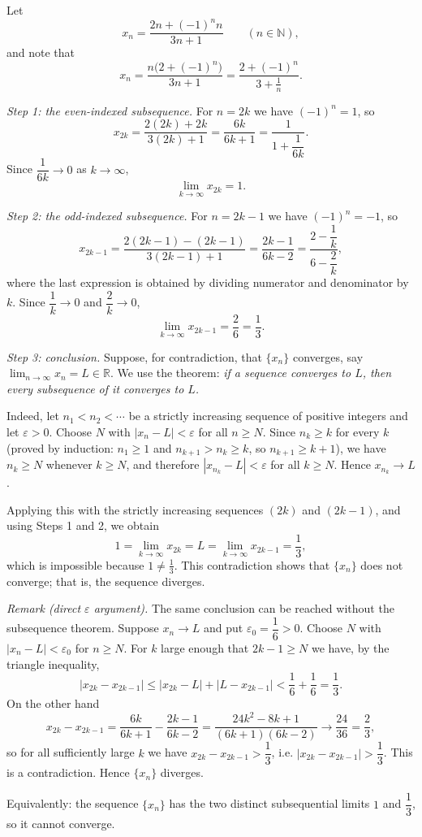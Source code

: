 \documentclass[11pt,a4paper]{article}
\newenvironment{solution}[1]{%
  \par\addvspace{1.7ex}%
  \noindent{\color{solutioncolor}\textbf{#1}}\hspace{0.55em}\ignorespaces}%
  {\par\addvspace{0.9ex}}
\begin{document}
\begin{solution}{Solution 2.1.5}\label{xs:2.1.5}
Let
\[
  x_n=\frac{2n+(-1)^{n}n}{3n+1}\qquad(n\in\mathbb{N}),
\]
and note that
\[
  x_n=\frac{n\bigl(2+(-1)^{n}\bigr)}{3n+1}
  =\frac{2+(-1)^{n}}{3+\tfrac1n} .
\]

\medskip
\noindent\emph{Step 1: the even-indexed subsequence.}
For $n=2k$ we have $(-1)^{n}=1$, so
\[
  x_{2k}=\frac{2(2k)+2k}{3(2k)+1}=\frac{6k}{6k+1}
  =\frac{1}{1+\dfrac{1}{6k}} .
\]
Since $\dfrac{1}{6k}\to0$ as $k\to\infty$,
\[
  \lim_{k\to\infty}x_{2k}=1 .
\]

\medskip
\noindent\emph{Step 2: the odd-indexed subsequence.}
For $n=2k-1$ we have $(-1)^{n}=-1$, so
\[
  x_{2k-1}=\frac{2(2k-1)-(2k-1)}{3(2k-1)+1}
  =\frac{2k-1}{6k-2}
  =\frac{2-\dfrac1k}{6-\dfrac2k},
\]
where the last expression is obtained by dividing numerator and denominator by
$k$. Since $\dfrac1k\to0$ and $\dfrac2k\to0$,
\[
  \lim_{k\to\infty}x_{2k-1}=\frac{2}{6}=\frac13 .
\]

\medskip
\noindent\emph{Step 3: conclusion.}
Suppose, for contradiction, that $\{x_n\}$ converges, say
$\displaystyle\lim_{n\to\infty}x_n=L\in\mathbb{R}$. We use the theorem: \emph{if a
sequence converges to $L$, then every subsequence of it converges to $L$.}

Indeed, let $n_1<n_2<\cdots$ be a strictly increasing sequence of positive
integers and let $\varepsilon>0$. Choose $N$ with $|x_n-L|<\varepsilon$ for all
$n\ge N$. Since $n_k\ge k$ for every $k$ (proved by induction: $n_1\ge1$ and
$n_{k+1}>n_k\ge k$, so $n_{k+1}\ge k+1$), we have $n_k\ge N$ whenever $k\ge N$,
and therefore $|x_{n_k}-L|<\varepsilon$ for all $k\ge N$. Hence $x_{n_k}\to L$.

Applying this with the strictly increasing sequences $(2k)$ and $(2k-1)$, and
using Steps 1 and 2, we obtain
\[
  1=\lim_{k\to\infty}x_{2k}=L=\lim_{k\to\infty}x_{2k-1}=\frac13 ,
\]
which is impossible because $1\ne\tfrac13$. This contradiction shows that
$\{x_n\}$ does not converge; that is, the sequence diverges.

\medskip
\noindent\emph{Remark (direct $\varepsilon$ argument).} The same conclusion can
be reached without the subsequence theorem. Suppose $x_n\to L$ and put
$\varepsilon_0=\dfrac16>0$. Choose $N$ with $|x_n-L|<\varepsilon_0$ for $n\ge N$.
For $k$ large enough that $2k-1\ge N$ we have, by the triangle inequality,
\[
  \bigl|x_{2k}-x_{2k-1}\bigr|
  \le|x_{2k}-L|+|L-x_{2k-1}|<\frac16+\frac16=\frac13 .
\]
On the other hand
\[
  x_{2k}-x_{2k-1}=\frac{6k}{6k+1}-\frac{2k-1}{6k-2}
  =\frac{24k^{2}-8k+1}{(6k+1)(6k-2)}\longrightarrow\frac{24}{36}=\frac23 ,
\]
so for all sufficiently large $k$ we have $x_{2k}-x_{2k-1}>\dfrac13$, i.e.
$|x_{2k}-x_{2k-1}|>\dfrac13$. This is a contradiction. Hence $\{x_n\}$ diverges.

\medskip
\noindent Equivalently: the sequence $\{x_n\}$ has the two distinct
subsequential limits $1$ and $\dfrac13$, so it cannot converge.
\end{solution}
\end{document}
